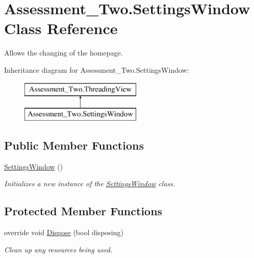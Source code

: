 \hypertarget{class_assessment___two_1_1_settings_window}{
\section{Assessment\_\-Two.SettingsWindow Class Reference}
\label{class_assessment___two_1_1_settings_window}
}


Allows the changing of the homepage.  


Inheritance diagram for Assessment\_\-Two.SettingsWindow:\begin{figure}[H]
\begin{center}
\leavevmode
\includegraphics[height=2.000000cm]{class_assessment___two_1_1_settings_window}
\end{center}
\end{figure}
\subsection*{Public Member Functions}
\begin{DoxyCompactItemize}
\item 
\hyperlink{class_assessment___two_1_1_settings_window_a968c470620aff64839d3a46b15bc129c}{SettingsWindow} ()
\begin{DoxyCompactList}\small\item\em Initializes a new instance of the \hyperlink{class_assessment___two_1_1_settings_window}{SettingsWindow} class. \item\end{DoxyCompactList}\end{DoxyCompactItemize}
\subsection*{Protected Member Functions}
\begin{DoxyCompactItemize}
\item 
override void \hyperlink{class_assessment___two_1_1_settings_window_a0e460811014b461b089bd9190d21c5bc}{Dispose} (bool disposing)
\begin{DoxyCompactList}\small\item\em Clean up any resources being used. \item\end{DoxyCompactList}\end{DoxyCompactItemize}


